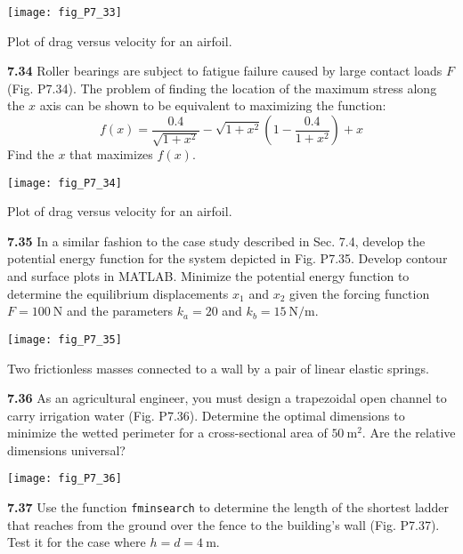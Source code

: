 \documentclass[../main.tex]{subfiles}
\begin{document}
\begin{multicols}{2}
	\begin{center}
	\texttt{[image: fig\_P7\_33]}
			
	\textsf{Plot of drag versus velocity for an airfoil.}
	\end{center}

	\noindent \textbf{7.34} Roller bearings are subject to fatigue failure caused by large contact loads $F$ (Fig. P7.34). The problem of finding the location of the maximum stress along the $x$ axis can be shown to be equivalent to maximizing the function:
	$$
	f(x)=\frac{0.4}{\sqrt{1+x^{2}}}-\sqrt{1+x^{2}}\left(1-\frac{0.4}{1+x^{2}}\right)+x
	$$
	Find the $x$ that maximizes $f(x)$.

	\begin{center}
	\texttt{[image: fig\_P7\_34]}
				
	\textsf{Plot of drag versus velocity for an airfoil.}
	\end{center}

	\noindent \textbf{7.35} In a similar fashion to the case study described in Sec. 7.4, develop the potential energy function for the system depicted in Fig. P7.35. Develop contour and surface
	plots in MATLAB. Minimize the potential energy function to determine the equilibrium displacements $x_{1}$ and $x_{2}$ given the forcing function $F=100 \mathrm{~N}$ and the parameters $k_{a}=20$ and $k_{b}=15 \mathrm{~N} / \mathrm{m}$.
	
	\begin{center}
	\texttt{[image: fig\_P7\_35]}
				
	\textsf{Two frictionless masses connected to a wall by a pair of
	linear elastic springs.}
	\end{center}

	\noindent \textbf{7.36} As an agricultural engineer, you must design a trapezoidal open channel to carry irrigation water (Fig. P7.36). Determine the optimal dimensions to minimize the wetted perimeter for a cross-sectional area of $50 \mathrm{~m}^{2}$. Are the relative dimensions universal?
	
	\begin{center}
	\texttt{[image: fig\_P7\_36]}
	\end{center}

	\noindent \textbf{7.37} Use the function \texttt{fminsearch} to determine the length of the shortest ladder that reaches from the ground over the fence to the building's wall (Fig. P7.37). Test it for the case where $h=d=4 \mathrm{~m}$.


\end{multicols}
\end{document}
